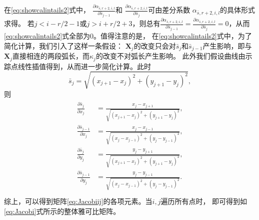 \documentclass[a4paper,twoside]{ctexart}
\newcommand{\pdfrac}[2]{\frac{\partial #1}{\partial #2}}
\begin{document}
在\eqref{eq:showcalintails2}式中，
$\pdfrac{\alpha_{\bar{s},r+2,i,l}}{\bar{s}_{j-1}}$和
$\pdfrac{\alpha_{\bar{s},r+2,i,l}}{\bar{s}_{j}}$可由差分系数
$\alpha_{\bar{s},r+2,i,l}$的具体形式求得。
若$j < i-r/2-1$或$j >
i+r/2+3$，则总有$\pdfrac{\alpha_{\bar{s},r+2,i,l}}{\bar{s}_{j-1}} =
\pdfrac{\alpha_{\bar{s},r+2,i,l}}{\bar{s}_{j}} = 0$，从而
\eqref{eq:showcalintails2}式全部为0。值得注意的是，
在\eqref{eq:showcalintails2}式中，为了简化计算，我们引入了这样一条假设：
$\boldsymbol X_j$的改变只会对$\bar{s}_{j}$和$\bar{s}_{j-1}$产生影响，即与
$\boldsymbol X_j$直接相连的两段弧长，而$\kappa_j$的改变不对弧长产生影响。
此外我们假设曲线由示踪点线性插值得到，从而进一步简化计算。此时
\begin{equation}
  \label{eq:appos}
  \bar{s}_j = \sqrt{(x_{j+1}-x_j)^2 + (y_{j+1} - y_j)^2},
\end{equation}
则
\begin{eqnarray}
  \label{eq:appods}
  \begin{aligned}
    \pdfrac{\bar{s}_j}{x_j} &= \frac{x_j -
      x_{j+1}}{\sqrt{(x_{j+1}-x_j)^2 + (y_{j+1} - y_j)^2}},\\
    \pdfrac{\bar{s}_{j-1}}{x_j} &= \frac{x_j -
      x_{j-1}}{\sqrt{(x_{j}-x_{j-1})^2 + (y_{j} - y_{j-1})^2}},\\
    \pdfrac{\bar{s}_j}{y_j} &= \frac{y_j -
      y_{j+1}}{\sqrt{(x_{j+1}-x_j)^2 + (y_{j+1} - y_j)^2}},\\
    \pdfrac{\bar{s}_{j-1}}{y_j} &= \frac{y_j -
      y_{j-1}}{\sqrt{(x_{j}-x_{j-1})^2 + (y_{j} - y_{j-1})^2}}.\\
  \end{aligned}
\end{eqnarray}
综上，可以得到矩阵\eqref{eq:Jacobiij}的各项元素。当$i,j$遍历所有点时，
即可得到如\eqref{eq:Jacobi}式所示的整体雅可比矩阵。
\end{document}
